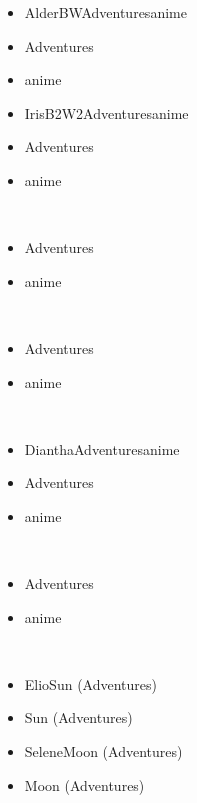 \documentclass[a4paper,12pt]{article}
\begin{document}
\begin{itemize}
\item AlderBWAdventuresanime
\item Adventures
\item anime
\item IrisB2W2Adventuresanime
\item Adventures
\item anime
\end{itemize}\\ \par \vspace{0.5cm}

\begin{itemize}
\item Adventures
\item anime
\end{itemize}\\ \par \vspace{0.5cm}

\begin{itemize}
\item Adventures
\item anime
\end{itemize}\\ \par \vspace{0.5cm}

\begin{itemize}
\item DianthaAdventuresanime
\item Adventures
\item anime
\end{itemize}\\ \par \vspace{0.5cm}

\begin{itemize}
\item Adventures
\item anime
\end{itemize}\\ \par \vspace{0.5cm}

\begin{itemize}
\item ElioSun (Adventures)
\item Sun (Adventures)
\item SeleneMoon (Adventures)
\item Moon (Adventures)
\end{itemize}\\ \par \vspace{0.5cm}
\end{document}
